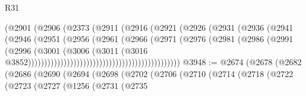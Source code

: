 \begin{lexlean}{R31}
\begin{coremodule}
                                                (@2901
                                                  (@2906
                                                    (@2373
                                                      (@2911
                                                        (@2916
                                                          (@2921
                                                            (@2926
                                                              (@2931
                                                                (@2936
                                                                  (@2941
                                                                    (@2946
                                                                      (@2951
                                                                        (@2956
                                                                          (@2961
                                                                            (@2966
                                                                              (@2971
                                                                                (@2976
                                                                                  (@2981
                                                                                    (@2986
                                                                                      (@2991
                                                                                        (@2996
                                                                                          (@3001
                                                                                            (@3006
                                                                                              (@3011
                                                                                                (@3016
                                                                                                  @3852)))))))))))))))))))))))))))))))))))))))))))))))
@3948 := @2674
    (@2678
      (@2682
        (@2686
          (@2690
            (@2694
              (@2698
                (@2702
                  (@2706
                    (@2710
                      (@2714
                        (@2718
                          (@2722
                            (@2723
                              (@2727
                                (@1256
                                  (@2731
                                    (@2735

\end{coremodule}
\end{lexlean}
